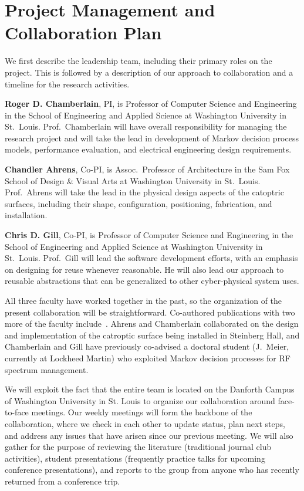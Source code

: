 \section{Project Management and Collaboration Plan}
\label{sec:collab}

We first describe the leadership team, including their primary roles
on the project.  This is followed by a description of our approach
to collaboration and a timeline for the research activities.

{\bf Roger D. Chamberlain}, PI, is Professor of Computer Science
and Engineering in the School of Engineering and Applied Science
at Washington University in St.~Louis.
Prof.~Chamberlain will have overall responsibility for managing the
research project and will take the lead in development of Markov
decision process models, performance evaluation, and electrical engineering
design requirements.

{\bf Chandler Ahrens}, Co-PI, is Assoc.~Professor of Architecture
in the Sam Fox School of Design \& Visual Arts
at Washington University in St.~Louis.
Prof.~Ahrens will take the lead in the physical design aspects of
the catoptric surfaces, including their shape, configuration, positioning,
fabrication, and installation.

{\bf Chris D. Gill}, Co-PI, is Professor of Computer Science
and Engineering in the School of Engineering and Applied Science
at Washington University in St.~Louis.
Prof.~Gill will lead the software development efforts, with an emphasis
on designing for reuse whenever reasonable.  He will also lead our
approach to reusable abstractions that can be generalized to other
cyber-physical system uses.

All three faculty have worked together in the past, so the organization
of the present collaboration will be straightforward.  Co-authored
publications with two more of the faculty
include~\cite{cag18,mgc16, mskgct13}. Ahrens and Chamberlain collaborated
on the design and implementation of the catroptic surface being
installed in Steinberg Hall, and Chamberlain and Gill have previously
co-advised a doctoral student (J.~Meier, currently at Lockheed Martin)
who exploited Markov decision processes for RF spectrum management.

We will exploit the fact that the entire team is located on the
Danforth Campus of Washington University in St. Louis to organize
our collaboration around face-to-face meetings.  Our weekly meetings will
form the backbone of the collaboration, where we check in each other to
update status, plan next steps, and address any issues that have arisen
since our previous meeting.
We will also gather for the purpose of reviewing the literature
(traditional journal club activities), student presentations (frequently
practice talks for upcoming conference presentations), and reports
to the group from anyone who has recently returned from a conference trip.

